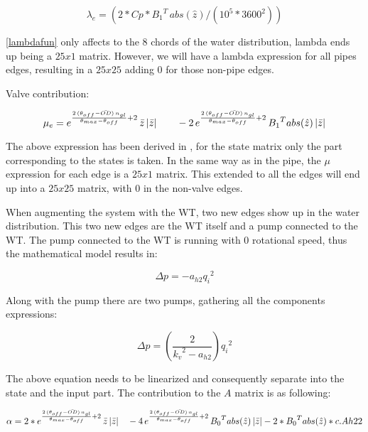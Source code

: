 \begin{equation}
  {\lambda}_e = (2 * Cp * {B_1}^{T} \, abs(\hat{z}) /(10^5*3600^2))
  \label{lambdafun}
\end{equation}

\eqref{lambdafun} only affects to the 8 chords of the water distribution, lambda ends up being a $25x1$ matrix. However, we will have a lambda expression for all pipes
edges, resulting in a $25x25$ adding $0$ for those non-pipe edges. 

Valve contribution:

\vspace{4mm}
\begin{equation}
  {\mu}_e = e^{\frac{2 \, (\theta_{off} - \bar{OD}) \, n_{gl}}{\theta_{max}-\theta_{off}}+2} \, \bar{z} \, |\bar{z}| \quad \quad - \\
  2 \, e^{\frac{2 \, (\theta_{off} - \bar{OD}) \, n_{gl}}{\theta_{max}-\theta_{off}}+2} \, {B_1}^{T} abs(\hat{z}) \, |\bar{z}|
  \label{mufun}
\end{equation}

The above expression has been derived in , for the state matrix only the part corresponding to the states is taken. In the same way 
as in the pipe, the $\mu$ expression for each edge is a $25x1$ matrix. This extended to all the edges will end up into a $25x25$ matrix, with $0$ in the 
non-valve edges. 

When augmenting the system with the WT, two new edges show up in the water distribution. This two new edges are the WT itself and a pump connected to the WT.
The pump connected to the WT is running with $0$ rotational speed, thus the mathematical model results in:

\begin{equation}
    \Delta p = -a_{h2}{q_i}^2 
\end{equation}

Along with the pump there are two pumps, gathering all the components expressions:

\begin{equation}
      \Delta p = (\frac{2}{{k_v}^2-a_{h2}}){q_i}^2 
\end{equation} 

The above equation needs to be linearized and consequently separate into the state and the input part. The contribution to the $A$ matrix is as 
following:

\begin{equation}
  \alpha = 2 * e^{\frac{2 \, (\theta_{off} - \bar{OD}) \, n_{gl}}{\theta_{max}-\theta_{off}}+2} \, \bar{z} \, |\bar{z}| \quad - \\
  4 \, e^{\frac{2 \, (\theta_{off} - \bar{OD}) \, n_{gl}}{\theta_{max}-\theta_{off}}+2} \, {B_0}^{T} abs(\hat{z}) \, |\bar{z}| - 2 * {B_0}^{T} abs(\hat{z}) * c.Ah22
\end{equation}

